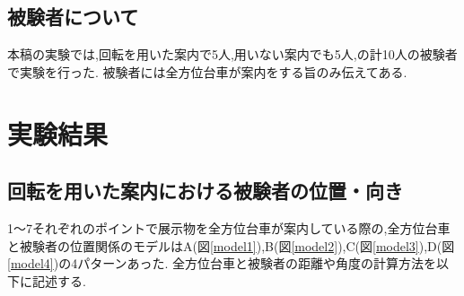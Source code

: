 \begin{comment}
\begin{figure}[!h]
\begin{center}
\texttt{[image: exp7.eps]}
\caption{7の展示物}
\label{exp7}
\end{center}
\end{figure}
\end{comment}

\begin{comment}
\begin{figure}[!h]
\begin{center}
\texttt{[image: exppic.eps]}
\caption{実験空間の写真}
\label{exppic}
\end{center}
\end{figure}
\end{comment}

\begin{comment}
\begin{figure}[!h]
\begin{center}
\texttt{[image: expomni.eps]}
\caption{実験時の全方位台車}
\label{expomni}
\end{center}
\end{figure}
\end{comment}

\begin{comment}
\begin{figure}[!h]
\begin{center}
\texttt{[image: exphum.eps]}
\caption{実験時の被験者の装備}
\label{exphum}
\end{center}
\end{figure}
\end{comment}





\subsection{被験者について}
本稿の実験では,回転を用いた案内で5人,用いない案内でも5人,の計10人の被験者で実験を行った.
被験者には全方位台車が案内をする旨のみ伝えてある.

\newpage

\section{実験結果}
\subsection{回転を用いた案内における被験者の位置・向き}
1～7それぞれのポイントで展示物を全方位台車が案内している際の,全方位台車と被験者の位置関係のモデルはA(図\ref{model1}),B(図\ref{model2}),C(図\ref{model3}),D(図\ref{model4})の4パターンあった.
全方位台車と被験者の距離や角度の計算方法を以下に記述する.

